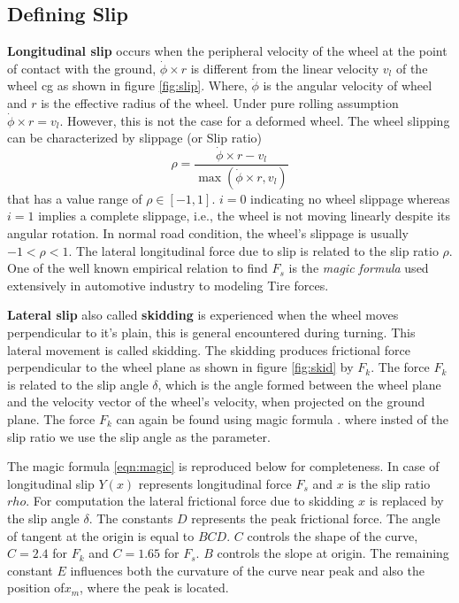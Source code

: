 {\subsection{Defining Slip}
\textbf{Longitudinal slip} occurs when the peripheral velocity of the wheel at the point of contact with the ground, $\dot{\phi} \times r$ is different from the linear velocity $v_l$ of the wheel cg as shown in figure \ref{fig:slip}. Where, $\dot{\phi}$ is the angular velocity of wheel and $r$ is the effective radius of the wheel. Under pure rolling assumption  $\dot{\phi} \times r=v_l$. However, this is not the case for a deformed wheel. The wheel slipping can be characterized by
slippage (or Slip ratio) \[\rho = \frac{\dot{\phi} \times r - v_l}{\max(\dot{\phi} \times r,v_l)}\] that has a value range of $ \rho \in [-1, 1]$.  $i = 0$
indicating no wheel slippage whereas $i = 1$ implies a complete slippage, i.e., the wheel is not moving linearly despite its angular rotation. In normal road condition, the wheel's slippage is usually $-1<\rho<1 $. The lateral longitudinal force due to slip is related to the slip ratio $\rho$. One of the well known empirical relation to find $F_s$ is the \textit{ magic formula} \cite{pacejka1992magic} used extensively in automotive industry to modeling Tire forces. 

 \textbf{Lateral slip }also called \textbf{skidding} is experienced when the wheel moves perpendicular to it's plain, this is general encountered during turning. This lateral movement is called skidding. The skidding produces frictional force perpendicular to the wheel plane as shown in figure \ref{fig:skid} by $F_k$. The force $F_k$ is related to the slip angle $\delta$, which is the angle formed between the wheel plane and the velocity vector of the wheel's velocity, when projected on the ground plane.
 The force $F_k$ can again be found using magic formula \cite{pacejka1992magic}. where insted of the slip ratio we use the slip angle as the parameter.
 
 The magic formula \ref{eqn:magic} is reproduced below for completeness. In case of longitudinal slip $Y(x)$ represents longitudinal force $F_s$ and $x$ is the slip ratio $rho$. For computation the lateral frictional force due to skidding $x$ is replaced by the slip angle $\delta$. The constants $D$ represents the peak frictional force. The angle of  tangent at the origin is equal to $BCD$. $C$ controls the shape of the curve, $C=2.4$ for $F_k$ and  $C=1.65$ for $F_s$. $B$ controls the slope at origin. The remaining constant $E$ influences both the curvature of the curve near peak and also the position of$x_m$, where the peak is located.
 
}
